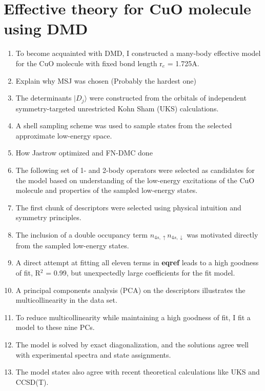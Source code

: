 \documentclass{article}
\begin{document}
\section{Effective theory for CuO molecule using DMD}
\begin{enumerate}
\item To become acquainted with DMD, I constructed a many-body effective model for the CuO molecule with fixed bond length r$_e$ = 1.725A.

\item Explain why MSJ was chosen (Probably the hardest one)

\item The determinants $|D_j \rangle$ were constructed from the orbitals of independent symmetry-targeted unrestricted Kohn Sham (UKS) calculations.

\item A shell sampling scheme was used to sample states from the selected approximate low-energy space. 

\item How Jastrow optimized and FN-DMC done

\item The following set of 1- and 2-body operators were selected as candidates for the model based on understanding of the low-energy excitations of the CuO molecule and properties of the sampled low-energy states.

\item The first chunk of descriptors were selected using physical intuition and symmetry principles.

\item The inclusion of a double occupancy term $n_{4s,\uparrow} n_{4s,\downarrow}$ was motivated directly from the sampled low-energy states.

\item A direct attempt at fitting all eleven terms in \textbf{eqref} leads to a high goodness of fit, R$^2$ = 0.99, but unexpectedly large coefficients for the fit model.

\item A principal components analysis (PCA) on the descriptors illustrates the multicollinearity in the data set.

\item To reduce multicollinearity while maintaining a high goodness of fit, I fit a model to these nine PCs.

\item The model is solved by exact diagonalization, and the solutions agree well with experimental spectra and state assignments.

\item The model states also agree with recent theoretical calculations like UKS and CCSD(T).

\end{enumerate}
\end{document}
